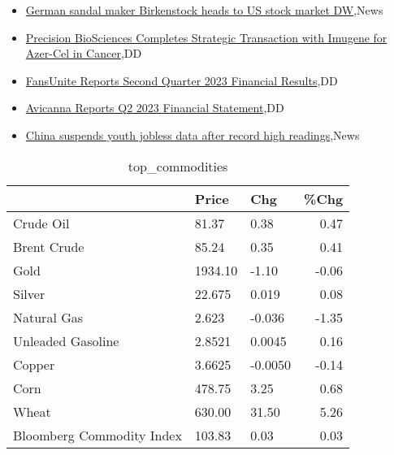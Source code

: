 \documentclass{article}%
\begin{document}
%
\begin{itemize}%
\item%
\href{https://reddit.com/r/wallstreetbets/comments/15si0yj/german\_sandal\_maker\_birkenstock\_heads\_to\_us\_stock/}{German sandal maker Birkenstock heads to US stock market  DW},News%
\item%
\href{https://reddit.com/r/Baystreetbets/comments/15sjyu9/precision\_biosciences\_completes\_strategic/}{Precision BioSciences Completes Strategic Transaction with Imugene for Azer-Cel in Cancer},DD%
\item%
\href{https://reddit.com/r/Baystreetbets/comments/15rux7n/fansunite\_reports\_second\_quarter\_2023\_financial/}{FansUnite Reports Second Quarter 2023 Financial Results},DD%
\item%
\href{https://reddit.com/r/Baystreetbets/comments/15rucak/avicanna\_reports\_q2\_2023\_financial\_statement/}{Avicanna Reports Q2 2023 Financial Statement},DD%
\item%
\href{https://reddit.com/r/Economics/comments/15s5njc/china\_suspends\_youth\_jobless\_data\_after\_record/}{China suspends youth jobless data after record high readings},News%
\end{itemize}%


\begin{table}[htbp]%
\caption{top\_commodities}%
\centering%
\begin{adjustbox}{width=1\textwidth}%
\begin{tabular}{lllr}
\toprule
                          &   Price &     Chg &  \%Chg \\
\midrule
               Crude Oil  &   81.37 &    0.38 &  0.47 \\
             Brent Crude  &   85.24 &    0.35 &  0.41 \\
                    Gold  & 1934.10 &   -1.10 & -0.06 \\
                  Silver  &  22.675 &   0.019 &  0.08 \\
             Natural Gas  &   2.623 &  -0.036 & -1.35 \\
       Unleaded Gasoline  &  2.8521 &  0.0045 &  0.16 \\
                  Copper  &  3.6625 & -0.0050 & -0.14 \\
                    Corn  &  478.75 &    3.25 &  0.68 \\
                   Wheat  &  630.00 &   31.50 &  5.26 \\
Bloomberg Commodity Index &  103.83 &    0.03 &  0.03 \\
\bottomrule
\end{tabular}
%
\end{adjustbox}%
\end{table}
\end{document}
